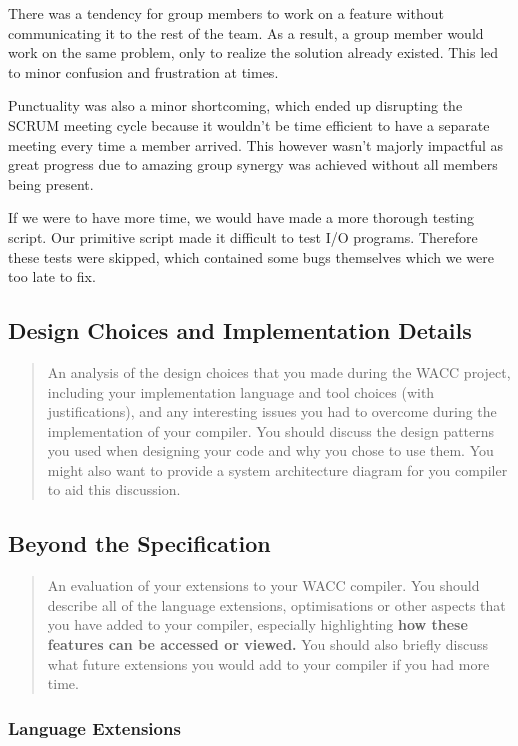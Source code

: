 \documentclass[a4paper,12pt]{article}
\begin{document}
There was a tendency for group members to work on a feature without communicating it to the rest of the team. As a result, a group member would work on the same problem, only to realize the solution already existed. This led to minor confusion and frustration at times.

Punctuality was also a minor shortcoming, which ended up disrupting the SCRUM meeting cycle because it wouldn't be time efficient to have a separate meeting every time a member arrived. This however wasn't majorly impactful as great progress due to amazing group synergy was achieved without all members being present.

If we were to have more time, we would have made a more thorough testing script. Our primitive script made it difficult to test I/O programs. Therefore these tests were skipped, which contained some bugs themselves which we were too late to fix.

\subsection*{Design Choices and Implementation Details}

\begin{quote}
    An analysis of the design choices that you
made during the WACC project, including your implementation language and tool choices (with
justifications), and any interesting issues you had to overcome during the implementation of your
compiler. You should discuss the design patterns you used when designing your code and why you
chose to use them. You might also want to provide a system architecture diagram for you compiler
to aid this discussion.
\end{quote}


\subsection*{Beyond the Specification}

\begin{quote}
     An evaluation of your extensions to your WACC compiler. You
should describe all of the language extensions, optimisations or other aspects that you have added
to your compiler, especially highlighting \textbf{how these features can be accessed or viewed.} You should
also briefly discuss what future extensions you would add to your compiler if you had more time.
\end{quote}

\subsubsection*{Language Extensions}
\end{document}
